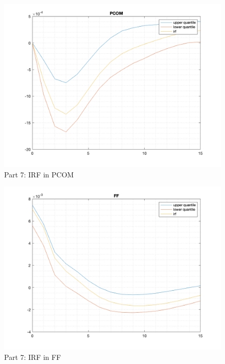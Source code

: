 \documentclass[10pt,letter]{article}
\begin{document}
\begin{figure}
\begin{center}
\includegraphics[width=15cm]{ps9fig3}
\caption{Part 7: IRF in PCOM}
\end{center}
\end{figure}
\begin{figure}
\begin{center}
\includegraphics[width=15cm]{ps9fig4}
\caption{Part 7: IRF in FF}
\end{center}
\end{figure}
\end{document}
